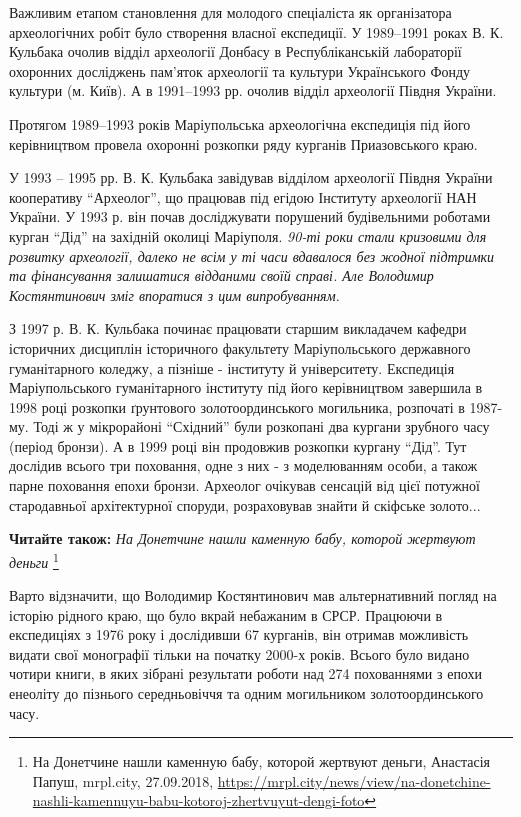 Важливим етапом становлення для молодого спеціаліста як організатора
археологічних робіт було створення власної експедиції. У 1989–1991 роках В. К.
Кульбака очолив відділ археології Донбасу в Республіканській лабораторії
охоронних досліджень пам'яток археології та культури Українського Фонду
культури (м. Київ). А в 1991–1993 рр. очолив відділ археології Півдня України.

Протягом 1989–1993 років Маріупольська археологічна експедиція під його
керівництвом провела охоронні розкопки ряду курганів Приазовського краю.

У 1993 – 1995 рр. В. К. Кульбака завідував відділом археології Півдня України
кооперативу \enquote{Археолог}, що працював під егідою Інституту археології НАН
України. У 1993 р. він почав досліджувати порушений будівельними роботами
курган \enquote{Дід} на західній околиці Маріуполя. \emph{90-ті роки стали кризовими для
розвитку археології, далеко не всім у ті часи вдавалося без жодної підтримки та
фінансування залишатися відданими своїй справі. Але Володимир Костянтинович
зміг впоратися з цим випробуванням.}


З 1997 р. В. К. Кульбака починає працювати старшим викладачем кафедри
історичних дисциплін історичного факультету Маріупольського державного
гуманітарного коледжу, а пізніше - інституту й університету. Експедиція
Маріупольського гуманітарного інституту під його керівництвом завершила в 1998
році розкопки ґрунтового золотоординського могильника, розпочаті в 1987-му.
Тоді ж у мікрорайоні \enquote{Східний} були розкопані два кургани зрубного часу
(період бронзи).  А в 1999 році він продовжив розкопки кургану \enquote{Дід}.
Тут дослідив всього три поховання, одне з них - з моделюванням особи, а також
парне поховання епохи бронзи. Археолог очікував сенсацій від цієї потужної
стародавньої архітектурної споруди, розраховував знайти й скіфське золото...

\textbf{Читайте також:} \emph{На Донетчине нашли каменную бабу, которой жертвуют деньги}%
\footnote{На Донетчине нашли каменную бабу, которой жертвуют деньги, Анастасія Папуш, mrpl.city, 27.09.2018, \url{https://mrpl.city/news/view/na-donetchine-nashli-kamennuyu-babu-kotoroj-zhertvuyut-dengi-foto}}

Варто відзначити, що Володимир Костянтинович мав альтернативний погляд на
історію рідного краю, що було вкрай небажаним в СРСР. Працюючи в експедиціях з
1976 року і дослідивши 67 курганів, він отримав можливість видати свої
монографії тільки на початку 2000-х років. Всього було видано чотири книги, в
яких зібрані результати роботи над 274 похованнями з епохи енеоліту до пізнього
середньовіччя та одним могильником золотоординського часу.

